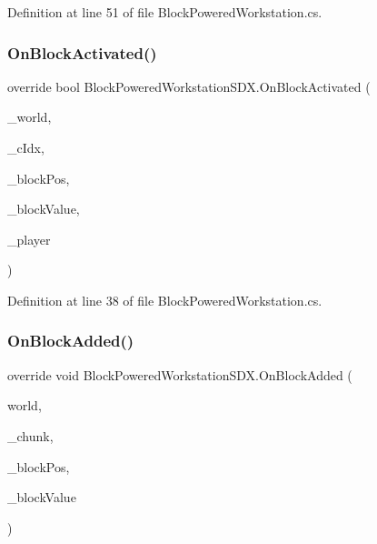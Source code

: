 Definition at line 51 of file Block\+Powered\+Workstation.\+cs.

\mbox{\label{class_block_powered_workstation_s_d_x_a04b461d7ce4512b302f5689850adb1ae}} 
\subsubsection{\texorpdfstring{OnBlockActivated()}{OnBlockActivated()}}
{\footnotesize\ttfamily override bool Block\+Powered\+Workstation\+S\+D\+X.\+On\+Block\+Activated (\begin{DoxyParamCaption}\item[{World\+Base}]{\+\_\+world,  }\item[{int}]{\+\_\+c\+Idx,  }\item[{Vector3i}]{\+\_\+block\+Pos,  }\item[{Block\+Value}]{\+\_\+block\+Value,  }\item[{Entity\+Alive}]{\+\_\+player }\end{DoxyParamCaption})}



Definition at line 38 of file Block\+Powered\+Workstation.\+cs.

\mbox{\label{class_block_powered_workstation_s_d_x_a7b62e07a42da3cb89ce0e47df42ab341}} 
\subsubsection{\texorpdfstring{OnBlockAdded()}{OnBlockAdded()}}
{\footnotesize\ttfamily override void Block\+Powered\+Workstation\+S\+D\+X.\+On\+Block\+Added (\begin{DoxyParamCaption}\item[{World\+Base}]{world,  }\item[{Chunk}]{\+\_\+chunk,  }\item[{Vector3i}]{\+\_\+block\+Pos,  }\item[{Block\+Value}]{\+\_\+block\+Value }\end{DoxyParamCaption})}



